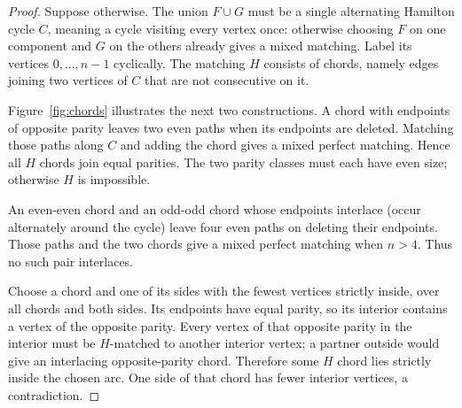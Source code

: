 \documentclass[11pt]{article}
\theoremstyle{definition}
\theoremstyle{plain}
\numberwithin{equation}{section}
\begin{document}
\begin{proof}
Suppose otherwise. The union \(F\cup G\) must be a single alternating
Hamilton cycle \(C\), meaning a cycle visiting every vertex once:
otherwise choosing \(F\) on one component and \(G\)
on the others already gives a mixed matching. Label its vertices
\(0,\ldots,n-1\) cyclically. The matching \(H\) consists of chords, namely edges joining two
vertices of \(C\) that are not consecutive on it.

Figure~\ref{fig:chords} illustrates the next two constructions.
A chord with endpoints of opposite parity leaves two even paths when its
endpoints are deleted. Matching those paths along \(C\) and adding the chord
gives a mixed perfect matching. Hence all \(H\) chords join equal parities.
The two parity classes must each have even size; otherwise \(H\) is impossible.

An even-even chord and an odd-odd chord whose endpoints interlace (occur alternately around the cycle) leave four
even paths on deleting their endpoints. Those paths and the two chords give
a mixed perfect matching when \(n>4\). Thus no such pair interlaces.

Choose a chord and one of its sides with the fewest vertices strictly inside,
over all chords and both sides. Its endpoints have equal parity, so its
interior contains a vertex of the opposite parity. Every vertex of that
opposite parity in the interior must be \(H\)-matched to another interior
vertex; a partner outside would give an interlacing opposite-parity chord.
Therefore some \(H\) chord lies strictly inside the chosen arc. One side of
that chord has fewer interior vertices, a contradiction.
\end{proof}
\end{document}
